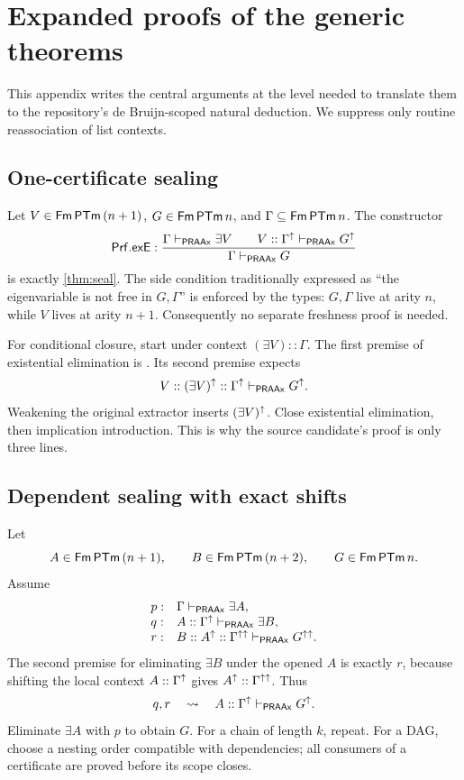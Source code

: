 \section{Expanded proofs of the generic theorems}
\label{app:proofs}

This appendix writes the central arguments at the level needed to translate
them to the repository's de Bruijn-scoped natural deduction.  We suppress only
routine reassociation of list contexts.

\subsection{One-certificate sealing}

Let \(V\in\mathsf{Fm}\,\mathsf{PTm}\,(n+1)\), \(G\in\mathsf{Fm}\,\mathsf{PTm}\,n\), and
\(\Gamma\subseteq\mathsf{Fm}\,\mathsf{PTm}\,n\).  The constructor
\[
\mathsf{Prf}.\mathsf{exE}:
 \frac{\Gamma\mathrel{\vdash_{\mathsf{PRAAx}}}\exists V
       \qquad V::\Gamma^{\mathord{\uparrow}}\mathrel{\vdash_{\mathsf{PRAAx}}} G^{\mathord{\uparrow}}}
      {\Gamma\mathrel{\vdash_{\mathsf{PRAAx}}} G}
\]
is exactly \cref{thm:seal}.  The side condition traditionally expressed as
``the eigenvariable is not free in \(G,\Gamma\)'' is enforced by the types:
\(G,\Gamma\) live at arity \(n\), while \(V\) lives at arity \(n+1\).
Consequently no separate freshness proof is needed.

For conditional closure, start under context
\((\exists V)::\Gamma\).  The first premise of existential elimination is
.  Its second premise expects
\[
 V::(\exists V)^{\mathord{\uparrow}}::\Gamma^{\mathord{\uparrow}}\mathrel{\vdash_{\mathsf{PRAAx}}} G^{\mathord{\uparrow}}.
\]
Weakening the original extractor inserts \((\exists V)^{\mathord{\uparrow}}\).  Close
existential elimination, then implication introduction.  This is why the
source candidate's proof is only three lines.

\subsection{Dependent sealing with exact shifts}

Let
\[
 A\in\mathsf{Fm}\,\mathsf{PTm}\,(n+1),
 \qquad B\in\mathsf{Fm}\,\mathsf{PTm}\,(n+2),
 \qquad G\in\mathsf{Fm}\,\mathsf{PTm}\,n.
\]
Assume
\[
\begin{array}{ll}
 p:&\Gamma\mathrel{\vdash_{\mathsf{PRAAx}}}\exists A,\\
 q:&A::\Gamma^{\mathord{\uparrow}}\mathrel{\vdash_{\mathsf{PRAAx}}}\exists B,\\
 r:&B::A^{\mathord{\uparrow}}::\Gamma^{\mathord{\uparrow}\mathord{\uparrow}}\mathrel{\vdash_{\mathsf{PRAAx}}} G^{\mathord{\uparrow}\mathord{\uparrow}}.
\end{array}
\]
The second premise for eliminating \(\exists B\) under the opened \(A\) is
exactly \(r\), because shifting the local context
\(A::\Gamma^{\mathord{\uparrow}}\) gives \(A^{\mathord{\uparrow}}::\Gamma^{\mathord{\uparrow}\mathord{\uparrow}}\).  Thus
\[
  q, r\quad\leadsto\quad
  A::\Gamma^{\mathord{\uparrow}}\mathrel{\vdash_{\mathsf{PRAAx}}} G^{\mathord{\uparrow}}.
\]
Eliminate \(\exists A\) with \(p\) to obtain \(G\).  For a chain of length
\(k\), repeat.  For a DAG, choose a nesting order compatible with dependencies;
all consumers of a certificate are proved before its scope closes.

